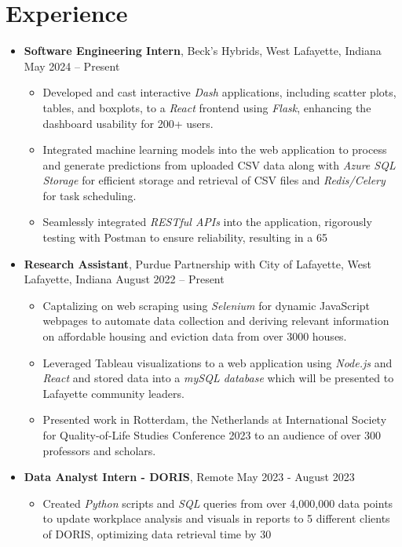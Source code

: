 \documentclass[letterpaper,11pt]{article}
\begin{document}
\section*{Experience}
\begin{itemize}[leftmargin=0.15in, label={}]
\item{
    \textbf{Software Engineering Intern}, Beck’s Hybrids, West Lafayette, Indiana \hfill May 2024 – Present
    \begin{itemize}
        \item Developed and cast interactive \textit{Dash} applications, including scatter plots, tables, and boxplots, to a \textit{React} frontend using \textit{Flask}, enhancing the dashboard usability for 200+ users.
        \item Integrated machine learning models into the web application to process and generate predictions from uploaded CSV data along with \textit{Azure SQL Storage} for efficient storage and retrieval of CSV files and \textit{Redis/Celery} for task scheduling.
        \item Seamlessly integrated \textit{RESTful APIs} into the application, rigorously testing with Postman to ensure reliability, resulting in a 65%
    \end{itemize}
}

\item{
    \textbf{Research Assistant}, Purdue Partnership with City of Lafayette, West Lafayette, Indiana \hfill August 2022 – Present
    \begin{itemize}
        \item Captalizing on web scraping using \textit{Selenium} for dynamic JavaScript webpages to automate data collection and deriving relevant information on affordable housing and eviction data from over 3000 houses.
        \item Leveraged Tableau visualizations to a web application using \textit{Node.js} and \textit{React} and stored data into a \textit{mySQL database} which will be presented to Lafayette community leaders.
        \item Presented work in Rotterdam, the Netherlands at International Society for Quality-of-Life Studies Conference 2023 to an audience of over 300 professors and scholars.
    \end{itemize}
}

\item{
    \textbf{Data Analyst Intern - DORIS}, Remote \hfill May 2023 - August 2023
    \begin{itemize}
        \item Created \textit{Python} scripts and \textit{SQL} queries from over 4,000,000 data points to update workplace analysis and visuals in reports to 5 different clients of DORIS, optimizing data retrieval time by 30%
    \end{itemize}
}
\end{itemize}
\end{document}
